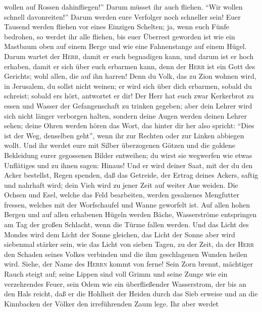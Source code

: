 wollen auf Rossen dahinfliegen!'' Darum müsset ihr auch fliehen. ``Wir
wollen schnell davonreiten!'' Darum werden eure Verfolger noch schneller
sein!  Euer Tausend werden fliehen vor eines Einzigen
Schelten; ja, wenn euch Fünfe bedrohen, so werdet ihr alle fliehen, bis
euer Überrest geworden ist wie ein Mastbaum oben auf einem Berge und wie
eine Fahnenstange auf einem Hügel.  Darum wartet der
\textsc{Herr}, damit er euch begnadigen kann, und darum ist er hoch
erhaben, damit er sich über euch erbarmen kann, denn der \textsc{Herr}
ist ein Gott des Gerichts; wohl allen, die auf ihn harren!
 Denn du Volk, das zu Zion wohnen wird, in Jerusalem, du
sollst nicht weinen; er wird sich über dich erbarmen, sobald du
schreist; sobald er\textquotesingle s hört, antwortet er dir!
 Der Herr hat euch zwar Kerkerbrot zu essen und Wasser
der Gefangenschaft zu trinken gegeben; aber dein Lehrer wird sich nicht
länger verborgen halten, sondern deine Augen werden deinen Lehrer sehen;
 deine Ohren werden hören das Wort, das hinter dir her
also spricht: ``Dies ist der Weg, denselben geht'', wenn ihr zur Rechten
oder zur Linken abbiegen wollt.  Und ihr werdet eure mit
Silber überzogenen Götzen und die goldene Bekleidung eurer gegossenen
Bilder entweihen; du wirst sie wegwerfen wie etwas Unflätiges und zu
ihnen sagen: Hinaus!  Und er wird deiner Saat, mit der du
den Acker bestellst, Regen spenden, daß das Getreide, der Ertrag deines
Ackers, saftig und nahrhaft wird; dein Vieh wird zu jener Zeit auf
weiter Aue weiden.  Die Ochsen und Esel, welche das Feld
bearbeiten, werden gesalzenes Mengfutter fressen, welches mit der
Worfschaufel und Wanne geworfelt ist.  Auf allen hohen
Bergen und auf allen erhabenen Hügeln werden Bäche, Wasserströme
entspringen am Tag der großen Schlacht, wenn die Türme fallen werden.
 Und das Licht des Mondes wird dem Licht der Sonne
gleichen, das Licht der Sonne aber wird siebenmal stärker sein, wie das
Licht von sieben Tagen, zu der Zeit, da der \textsc{Herr} den Schaden
seines Volkes verbinden und die ihm geschlagenen Wunden heilen wird.
 Siehe, der Name des \textsc{Herrn} kommt von ferne! Sein
Zorn brennt, mächtiger Rauch steigt auf; seine Lippen sind voll Grimm
und seine Zunge wie ein verzehrendes Feuer,  sein Odem
wie ein überfließender Wasserstrom, der bis an den Hals reicht, daß er
die Hohlheit der Heiden durch das Sieb erweise und an die Kinnbacken der
Völker den irreführenden Zaum lege.  Ihr aber werdet
